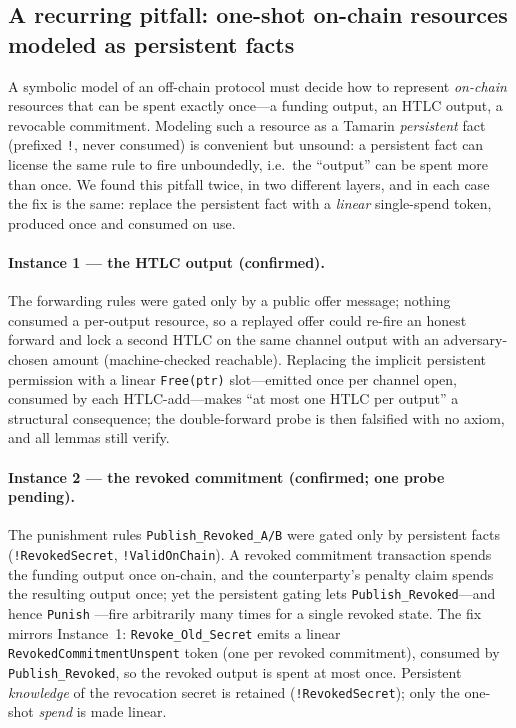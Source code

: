 
\subsection{A recurring pitfall: one-shot on-chain resources modeled as
persistent facts}
\label{sec:singlespend}

A symbolic model of an off-chain protocol must decide how to represent
\emph{on-chain} resources that can be spent exactly once---a funding output, an
HTLC output, a revocable commitment. Modeling such a resource as a Tamarin
\emph{persistent} fact (prefixed \texttt{!}, never consumed) is convenient but
unsound: a persistent fact can license the same rule to fire unboundedly, i.e.\
the ``output'' can be spent more than once. We found this pitfall twice, in two
different layers, and in each case the fix is the same: replace the persistent
fact with a \emph{linear} single-spend token, produced once and consumed on use.

\paragraph{Instance 1 --- the HTLC output (confirmed).}
The forwarding rules were gated only by a public offer message; nothing consumed
a per-output resource, so a replayed offer could re-fire an honest forward and
lock a second HTLC on the same channel output with an adversary-chosen amount
(machine-checked reachable). Replacing the implicit persistent permission with a
linear \texttt{Free(ptr)} slot---emitted once per channel open, consumed by each
HTLC-add---makes ``at most one HTLC per output'' a structural consequence; the
double-forward probe is then falsified with no axiom, and all lemmas still
verify.

\paragraph{Instance 2 --- the revoked commitment (confirmed; one probe pending).}
The punishment rules \texttt{Publish\_Revoked\_A/B} were gated only by
persistent facts (\texttt{!RevokedSecret}, \texttt{!ValidOnChain}). A revoked
commitment transaction spends the funding output once on-chain, and the
counterparty's penalty claim spends the resulting output once; yet the
persistent gating lets \texttt{Publish\_Revoked}---and hence \texttt{Punish}%
---fire arbitrarily many times for a single revoked state. The fix mirrors
Instance~1: \texttt{Revoke\_Old\_Secret} emits a linear
\texttt{RevokedCommitmentUnspent} token (one per revoked commitment), consumed
by \texttt{Publish\_Revoked}, so the revoked output is spent at most once.
Persistent \emph{knowledge} of the revocation secret is retained
(\texttt{!RevokedSecret}); only the one-shot \emph{spend} is made linear.


